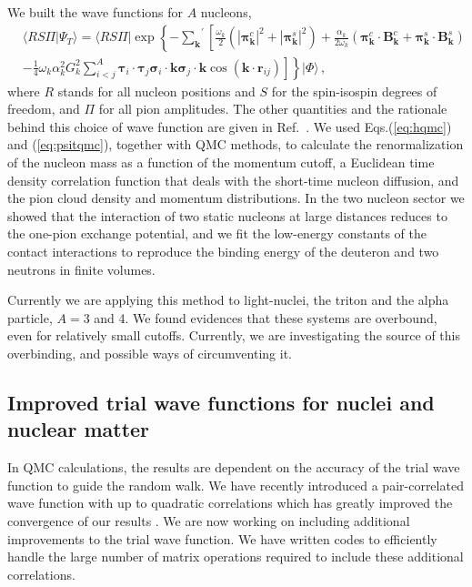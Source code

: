 \documentclass[12pt,letterpaper]{article}
\newcommand{\bvec}[1]{\boldsymbol {#1}}
\begin{document}
We built the wave functions for $A$ nucleons,
\begin{align}
\label{eq:psitqmc}
&\langle RS\Pi|\Psi_T\rangle =
\langle RS\Pi|
\exp\left\{
-{\sum_{\bvec k}}^\prime \left [
\frac{\omega_k}{2}(
|\bvec{\pi}_{\bvec{k}}^c|^2
+|\bvec {\pi}_{\bvec{k}}^s|^2)
+\frac{\alpha_k}{2\omega_k}
\left (
\bvec \pi_{\bvec k}^c \cdot \bvec B^c_{\bvec k}
+\bvec \pi_{\bvec k}^s \cdot \bvec B^s_{\bvec k}
\right )\right.\right.
\nonumber\\
&
\left .
\left .
-\frac{1}{4}\omega_k\alpha_k^2 G_k^2 \sum_{i<j}^A
\bvec \tau_i\cdot\bvec \tau_j
\bvec\sigma_i\cdot \bvec k
\bvec\sigma_j\cdot \bvec k
\cos(\bvec k\cdot \bvec r_{ij})
\right] \right \}
|\Phi\rangle\, ,
\end{align}
where $R$ stands for all nucleon positions and $S$ for the spin-isospin
degrees of freedom, and $\Pi$ for all pion amplitudes. The other
quantities and the rationale behind this choice of wave function
are given in Ref.~\cite{mad18}. We used Eqs.(\ref{eq:hqmc}) and (\ref{eq:psitqmc}), together with QMC methods, to calculate
the renormalization of the nucleon mass
as a function of the momentum cutoff, a Euclidean time density
correlation function that deals with the short-time nucleon diffusion, and the pion cloud density and
momentum distributions. In the two nucleon sector we showed that the interaction of two static nucleons
at large distances reduces to the one-pion exchange potential, and we fit the low-energy constants of the
contact interactions to reproduce the binding energy of the deuteron and two neutrons in finite volumes.

Currently we are 
applying this method to light-nuclei, the triton and the alpha particle, $A=3$ and 4.
We found evidences that these systems are overbound, even for
relatively small cutoffs. Currently, we are investigating the source
of this overbinding, and possible ways of circumventing it.

\subsection{Improved trial wave functions for nuclei and nuclear matter}
\label{sec:improved}

In QMC calculations, the results are dependent on the accuracy of the trial wave function to guide the random walk. We have recently introduced a pair-correlated wave function with up to quadratic correlations which has greatly improved the convergence of our results \cite{lon18}. We are now working on including additional improvements to the trial wave function. We have written codes to efficiently handle the large number of matrix operations required to include these additional correlations.
\end{document}

